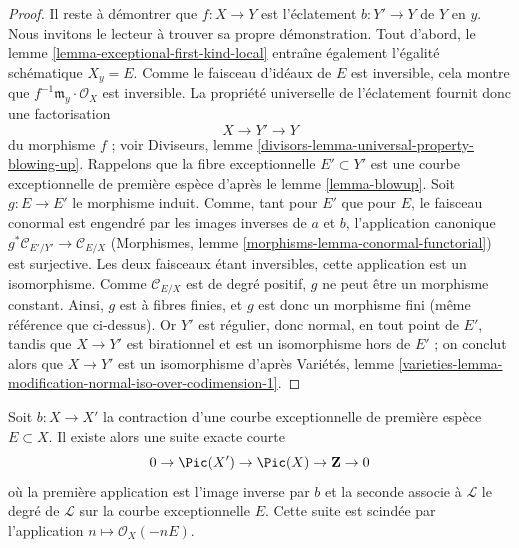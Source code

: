 \begin{proof}
\medskip\noindent Il reste à démontrer que $f : X \to Y$ est l'éclatement $b : Y' \to Y$ de $Y$ en $y$. Nous invitons le lecteur à trouver sa propre démonstration. Tout d'abord, le lemme \ref{lemma-exceptional-first-kind-local} entraîne également l'égalité schématique $X_y = E$. Comme le faisceau d'idéaux de $E$ est inversible, cela montre que $f^{-1}\mathfrak m_y \cdot \mathcal{O}_X$ est inversible. La propriété universelle de l'éclatement fournit donc une factorisation $$
X \to Y' \to Y
$$ du morphisme $f$ ; voir Diviseurs, lemme \ref{divisors-lemma-universal-property-blowing-up}. Rappelons que la fibre exceptionnelle $E' \subset Y'$ est une courbe exceptionnelle de première espèce d'après le lemme \ref{lemma-blowup}. Soit $g : E \to E'$ le morphisme induit. Comme, tant pour $E'$ que pour $E$, le faisceau conormal est engendré par les images inverses de $a$ et $b$, l'application canonique $g^*\mathcal{C}_{E'/Y'} \to \mathcal{C}_{E/X}$ (Morphismes, lemme \ref{morphisms-lemma-conormal-functorial}) est surjective. Les deux faisceaux étant inversibles, cette application est un isomorphisme. Comme $\mathcal{C}_{E/X}$ est de degré positif, $g$ ne peut être un morphisme constant. Ainsi, $g$ est à fibres finies, et $g$ est donc un morphisme fini (même référence que ci-dessus). Or $Y'$ est régulier, donc normal, en tout point de $E'$, tandis que $X \to Y'$ est birationnel et est un isomorphisme hors de $E'$ ; on conclut alors que $X \to Y'$ est un isomorphisme d'après Variétés, lemme \ref{varieties-lemma-modification-normal-iso-over-codimension-1}. \end{proof}

\begin{lemma} \label{lemma-pic-blowup} Soit $b : X \to X'$ la contraction d'une courbe exceptionnelle de première espèce $E \subset X$. Il existe alors une suite exacte courte $$
0 \to \Pic(X') \to \Pic(X) \to \mathbf{Z} \to 0
$$ où la première application est l'image inverse par $b$ et la seconde associe à $\mathcal{L}$ le degré de $\mathcal{L}$ sur la courbe exceptionnelle $E$. Cette suite est scindée par l'application $n \mapsto \mathcal{O}_X(-nE)$. \end{lemma}

